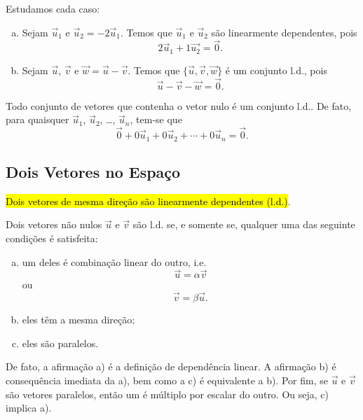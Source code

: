 \begin{ex}
  Estudamos cada caso:
  \begin{enumerate}[a)]
    \item Sejam $\vec{u}_1$ e $\vec{u}_2 = -2\vec{u}_1$. Temos que $\vec{u}_1$ e $\vec{u}_2$ são linearmente dependentes, pois
    \begin{equation}
    2\vec{u}_1 + 1\vec{u_2} = \vec{0}.
    \end{equation}
    \item Sejam $\vec{u}$, $\vec{v}$ e $\vec{w} = \vec{u} - \vec{v}$. Temos que $\{\vec{u}, \vec{v}, \vec{w}\}$ é um conjunto l.d., pois
    \begin{equation}
      \vec{u} - \vec{v} - \vec{w} = \vec{0}.
    \end{equation}
  \end{enumerate}
\end{ex}

\begin{obs}
  Todo conjunto de vetores que contenha o vetor nulo é um conjunto l.d.. De fato, para quaisquer $\vec{u}_1$, $\vec{u}_2$, \ldots, $\vec{u}_n$, tem-se que
  \begin{equation}
    \vec{0} + 0\vec{u}_1 + 0\vec{u}_2 + \cdots + 0\vec{u}_n = \vec{0}.
  \end{equation}
\end{obs}

\subsection{Dois Vetores no Espaço}\label{cap_base_sec_deplinear_ssec_2vec}

\hl{Dois vetores de mesma direção são linearmente dependentes (l.d.)}.

\begin{proposicao}\label{cap_base_sec_deplinear:prop:dl2vec}
  Dois vetores não nulos $\vec{u}$ e $\vec{v}$ são l.d. se, e somente se, qualquer uma das seguinte condições é satisfeita:
  \begin{enumerate}[a)]
  \item um deles é combinação linear do outro, i.e.
    \begin{equation}
      \vec{u} = \alpha\vec{v}
    \end{equation}
    ou
    \begin{equation}
      \vec{v}=\beta\vec{u}.
    \end{equation}
  \item eles têm a mesma direção;
  \item eles são paralelos.
  \end{enumerate}
\end{proposicao}
\begin{demonstracao}
  De fato, a afirmação a) é a definição de dependência linear. A afirmação b) é consequência imediata da a), bem como a c) é equivalente a b). Por fim, se $\vec{u}$ e $\vec{v}$ são vetores paralelos, então um é múltiplo por escalar do outro. Ou seja, c) implica a).  
\end{demonstracao}

